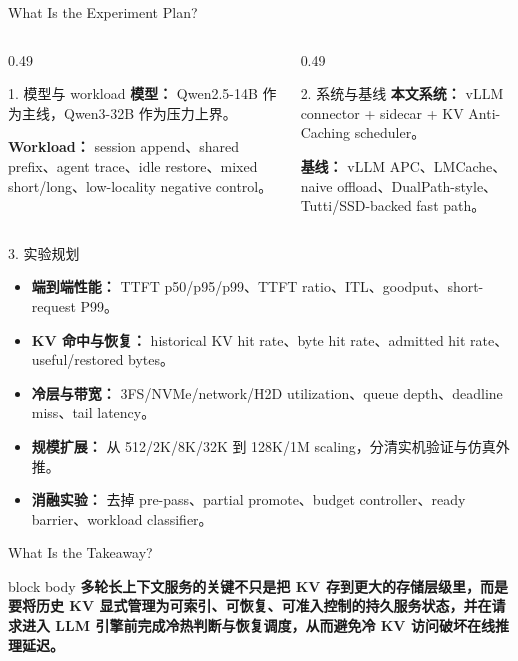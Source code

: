 \documentclass[aspectratio=169,10pt]{beamer}
\begin{document}
\begin{frame}[t]{What Is the Experiment Plan?}
\footnotesize
\vspace{-0.45em}

\begin{columns}[T,onlytextwidth]
\begin{column}{0.49\textwidth}
\begin{block}{1. 模型与 workload}
\textbf{模型：}
Qwen2.5-14B 作为主线，Qwen3-32B 作为压力上界。

\vspace{0.15em}
\textbf{Workload：}
session append、shared prefix、agent trace、idle restore、mixed short/long、low-locality negative control。
\end{block}
\end{column}

\begin{column}{0.49\textwidth}
\begin{block}{2. 系统与基线}
\textbf{本文系统：} vLLM connector + sidecar + KV Anti-Caching scheduler。

\vspace{0.15em}
\textbf{基线：} vLLM APC、LMCache、naive offload、DualPath-style、Tutti/SSD-backed fast path。
\end{block}
\end{column}
\end{columns}

\vspace{0.2em}

\begin{block}{3. 实验规划}
\begin{itemize}
  \setlength\itemsep{0.03em}
  \item \textbf{端到端性能：}
  TTFT p50/p95/p99、TTFT ratio、ITL、goodput、short-request P99。
  \item \textbf{KV 命中与恢复：}
  historical KV hit rate、byte hit rate、admitted hit rate、useful/restored bytes。
  \item \textbf{冷层与带宽：}
  3FS/NVMe/network/H2D utilization、queue depth、deadline miss、tail latency。
  \item \textbf{规模扩展：}
  从 512/2K/8K/32K 到 128K/1M scaling，分清实机验证与仿真外推。
  \item \textbf{消融实验：}
  去掉 pre-pass、partial promote、budget controller、ready barrier、workload classifier。
\end{itemize}
\end{block}

\end{frame}

\begin{frame}[t]{What Is the Takeaway?}
\small
\vspace{1.0em}

\begin{beamercolorbox}[wd=\linewidth,sep=1.05em,rounded=true]{block body}
\Large
\centering
\textbf{
多轮长上下文服务的关键不只是把 KV 存到更大的存储层级里，而是要将历史 KV 显式管理为可索引、可恢复、可准入控制的持久服务状态，并在请求进入 LLM 引擎前完成冷热判断与恢复调度，从而避免冷 KV 访问破坏在线推理延迟。
}
\end{beamercolorbox}

\end{frame}
\end{document}
